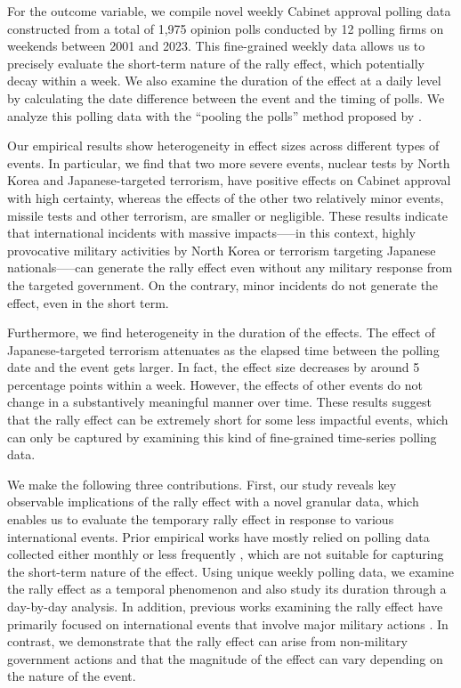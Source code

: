 \documentclass[letterpaper,12pt]{scrartcl}
\begin{document}
For the outcome variable, we compile novel weekly Cabinet approval polling data constructed from a total of 1,975 opinion polls conducted by 12 polling firms on weekends between 2001 and 2023. This fine-grained weekly data allows us to precisely evaluate the short-term nature of the rally effect, which potentially decay within a week. We also examine the duration of the effect at a daily level by calculating the date difference between the event and the timing of polls. We analyze this polling data with the ``pooling the polls'' method proposed by \citet{Jackman2005AustJPolitSci}.

Our empirical results show heterogeneity in effect sizes across different types of events. In particular, we find that two more severe events, nuclear tests by North Korea and Japanese-targeted terrorism, have positive effects on Cabinet approval with high certainty, whereas the effects of the other two relatively minor events, missile tests and other terrorism, are smaller or negligible. These results indicate that international incidents with massive impacts—--in this context, highly provocative military activities by North Korea or terrorism targeting Japanese nationals—--can generate the rally effect even without any military response from the targeted government. On the contrary, minor incidents do not generate the effect, even in the short term.

Furthermore, we find heterogeneity in the duration of the effects. The effect of Japanese-targeted terrorism attenuates as the elapsed time between the polling date and the event gets larger. In fact, the effect size decreases by around 5 percentage points within a week. However, the effects of other events do not change in a substantively meaningful manner over time. These results suggest that the rally effect can be extremely short for some less impactful events, which can only be captured by examining this kind of fine-grained time-series polling data.

We make the following three contributions. First, our study reveals key observable implications of the rally effect with a novel granular data, which enables us to evaluate the temporary rally effect in response to various international events. Prior empirical works have mostly relied on polling data collected either monthly \citep{marra1990,Parker1995POQ,Baker2001JCR,Lai2005ISQ} or less frequently \citep{lee1977,Kam2008POQ}, which are not suitable for capturing the short-term nature of the effect. Using unique weekly polling data, we examine the rally effect as a temporal phenomenon and also study its duration through a day-by-day analysis. In addition, previous works examining the rally effect have primarily focused on international events that involve major military actions \citep[e.g.,][]{oneal1996,Lai2005ISQ}. In contrast, we demonstrate that the rally effect can arise from non-military government actions and that the magnitude of the effect can vary depending on the nature of the event.
\end{document}
